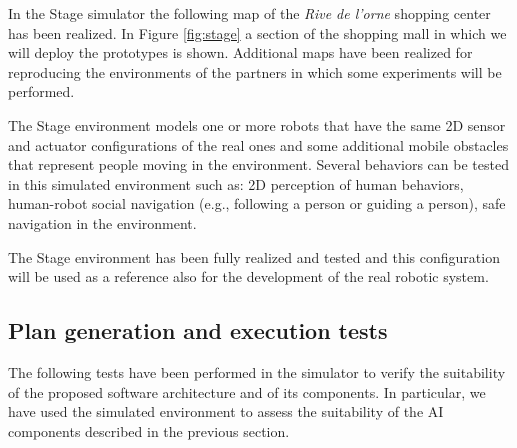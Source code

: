 In the Stage simulator the following map of the \emph{Rive de l'orne} shopping center has been realized. In Figure \ref{fig:stage} a section of the shopping mall in which we will deploy the prototypes is shown.
Additional maps have been realized for reproducing the environments of the partners in which some experiments will be performed.

The Stage environment models one or more robots that have the same 2D sensor and actuator configurations of the real ones and some additional mobile obstacles that represent people moving in the environment. Several behaviors can be tested in this simulated environment such as: 2D perception of human behaviors, human-robot social navigation (e.g., following a person or guiding a person), safe navigation in the environment.

The Stage environment has been fully realized and tested and this configuration will be used as a reference also for the development of the real robotic system.

\subsection{Plan generation and execution tests}

The following tests have been performed in the simulator to verify the suitability of the proposed software architecture and of its components. In particular, we have used the simulated environment to assess the suitability of the AI components described in the previous section.


